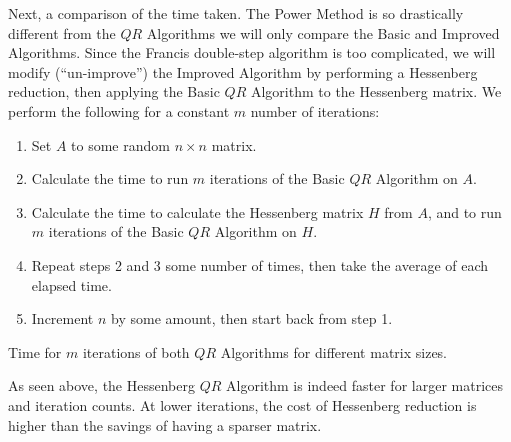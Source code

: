 \documentclass{article}
\begin{document}
Next, a comparison of the time taken. The Power Method is so drastically different from the $QR$ Algorithms we will only compare the Basic and Improved Algorithms. Since the Francis double-step algorithm is too complicated, we will modify (``un-improve'') the Improved Algorithm by performing a Hessenberg reduction, then applying the Basic $QR$ Algorithm to the Hessenberg matrix. We perform the following for a constant $m$ number of iterations:
\begin{enumerate}
	\item Set $A$ to some random $n\times n$ matrix.
	\item Calculate the time to run $m$ iterations of the Basic $QR$ Algorithm on $A$.
	\item Calculate the time to calculate the Hessenberg matrix $H$ from $A$, and to run $m$ iterations of the Basic $QR$ Algorithm on $H$.
	\item Repeat steps 2 and 3 some number of times, then take the average of each elapsed time.
	\item Increment $n$ by some amount, then start back from step 1.
\end{enumerate}

\begin{center}
	\resizebox{0.49\textwidth}{!}{}
	\resizebox{0.49\textwidth}{!}{}

	\resizebox{0.49\textwidth}{!}{}
	\resizebox{0.49\textwidth}{!}{}

	Time for $m$ iterations of both $QR$ Algorithms for different matrix sizes.
\end{center}

As seen above, the Hessenberg $QR$ Algorithm is indeed faster for larger matrices and iteration counts. At lower iterations, the cost of Hessenberg reduction is higher than the savings of having a sparser matrix.

\pagebreak
\printbibliography
\end{document}

